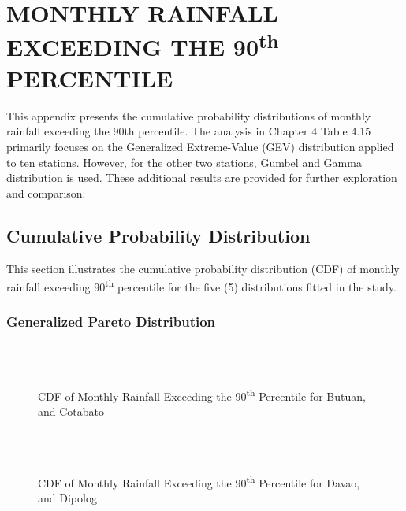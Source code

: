 \chapter{MONTHLY RAINFALL EXCEEDING THE 90\texorpdfstring{\textsuperscript{th}}{th} PERCENTILE}

This appendix presents the cumulative probability distributions of monthly rainfall exceeding the 90th percentile. The analysis in Chapter 4 Table 4.15 primarily focuses on the Generalized Extreme-Value (GEV) distribution applied to ten stations. However, for the other two stations, Gumbel and Gamma distribution is used. These additional results are provided for further exploration and comparison.

\section{Cumulative Probability Distribution}
This section illustrates the cumulative probability distribution (CDF) of monthly rainfall exceeding 90\textsuperscript{th} percentile for the five (5) distributions fitted in the study.

\subsection{Generalized Pareto Distribution}

\begin{figure}[H]
  \centering
  \\
  \\
  \caption{CDF of Monthly Rainfall Exceeding the 90\textsuperscript{th} Percentile for Butuan, and Cotabato}
  \label{fig:monthly_0.90_appendix_gpd_pt1}
\end{figure}

\begin{figure}[H]
  \centering
  \\
  \\
   \caption{CDF of Monthly Rainfall Exceeding the 90\textsuperscript{th} Percentile for Davao, and Dipolog}
 \label{fig:monthly_0.90_appendix_gpd_pt2}
\end{figure}

